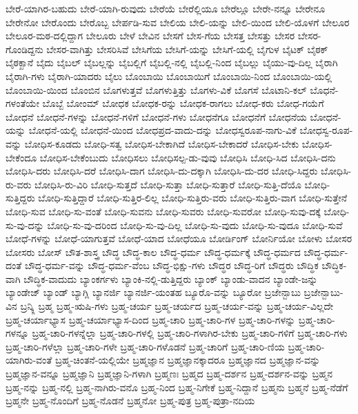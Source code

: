 {ಬೇರೆ-ಯಾಗಿರ-ಬಹುದು
ಬೇರೆ-ಯಾಗಿ-ರುವುದು
ಬೇರೆಯೆ
ಬೇರೆಲ್ಲಿಯೂ
ಬೇರೆಲ್ಲೂ
ಬೇರೇ-ನನ್ನೂ
ಬೇರೇನೂ
ಬೇರೇನೋ
ಬೇರೊಂದು
ಬೇರೊಬ್ಬ
ಬೇರ್ಪಡಿ-ಸುವ
ಬೇಲಿಯ
ಬೇಲಿ-ಯನ್ನು
ಬೇಲಿ-ಯಿಂದ
ಬೇಲಿ-ಯೊಳಗೆ
ಬೇಲೂರ
ಬೇಲೂರ-ಮಠ-ದಲ್ಲಿದ್ದಾಗ
ಬೇಲೂರು
ಬೇಳೆ
ಬೇವಿನ
ಬೇಸಗೆ
ಬೇಸ-ಗೆಯ
ಬೇಸತ್ತ
ಬೇಸತ್ತು
ಬೇಸರ
ಬೇಸರ-ಗೊಂಡಿದ್ದನು
ಬೇಸರ-ವಾಗಿತ್ತು
ಬೇಸರಿಸಿವೆ
ಬೇಸಿಗೆಯ
ಬೇಸಿಗೆ-ಯನ್ನು
ಬೇಸಿಗೆ-ಯಲ್ಲಿ
ಬೈಗುಳ
ಬೈಟಕ್
ಬೈಠಕ್
ಬೈಠಕ್ಖಾನೆ
ಬೈದು
ಬೈಬಲ್
ಬೈಬಲ್ಲನ್ನು
ಬೈಬಲ್ಲಿಗೆ
ಬೈಬಲ್ಲಿ-ನಲ್ಲಿ
ಬೈಬಲ್ಲಿ-ನಿಂದ
ಬೈಬಲ್ಲು
ಬೈಯು-ವು-ದಿಲ್ಲ
ಬೈರಾಗಿ
ಬೈರಾಗಿ-ಗಳು
ಬೈರಾಗಿ-ಯಾದರು
ಬೈಲು
ಬೊಂಬಾಯಿ
ಬೊಂಬಾಯಿಗೆ
ಬೊಂಬಾಯಿ-ನಿಂದ
ಬೊಂಬಾಯಿ-ಯಲ್ಲಿ
ಬೊಂಬಾಯಿ-ಯಿಂದ
ಬೊಂಬಿನ
ಬೊಗಳುತ್ತವೆ
ಬೊಗಳುತ್ತಿತ್ತು
ಬೊಗಳು-ವಿಕೆ
ಬೊಗಸೆ
ಬೊಟಾನಿ-ಕಲ್
ಬೊಧನೆ-ಗಳಂತೆಯೇ
ಬೊಬ್ಬೆ
ಬೋಂಮ್
ಬೋಧಕ
ಬೋಧಕ-ರನ್ನು
ಬೋಧಕ-ರಾಗಲು
ಬೋಧ-ಕರು
ಬೋಧ-ಗಯೆಗೆ
ಬೋಧನೆ
ಬೋಧನೆ-ಗಳನ್ನು
ಬೋಧನೆ-ಗಳಿಗೆ
ಬೋಧನೆ-ಗಳು
ಬೋಧನೆಗೂ
ಬೋಧನೆಗೆ
ಬೋಧನೆಯ
ಬೋಧನೆ-ಯನ್ನು
ಬೋಧನೆ-ಯಲ್ಲಿ
ಬೋಧನೆ-ಯಿಂದ
ಬೋಧಪ್ರದ-ವಾದು-ದನ್ನು
ಬೋಧಸ್ವರೂಪ-ನಾಗು-ವಿಕೆ
ಬೋಧಸ್ವ-ರೂಪ-ವನ್ನು
ಬೋಧಿಸ-ಕೂಡದು
ಬೋಧಿ-ಸತ್ವ
ಬೋಧಿಸ-ಬೇಕಾಗಿದೆ
ಬೋಧಿಸ-ಬೇಕಾದರೆ
ಬೋಧಿಸ-ಬೇಕು
ಬೋಧಿಸ-ಬೇಕೆಂದೂ
ಬೋಧಿಸ-ಬೇಕೆಂಬುದು
ಬೋಧಿಸಲು
ಬೋಧಿಸಲ್ಪ-ಡು-ವುವು
ಬೋಧಿಸಿ
ಬೋಧಿ-ಸಿದ
ಬೋಧಿಸಿ-ದನು
ಬೋಧಿಸಿ-ದರು
ಬೋಧಿಸಿ-ದರೆ
ಬೋಧಿಸಿ-ದಾಗ
ಬೋಧಿಸಿ-ದು-ದಕ್ಕಾಗಿ
ಬೋಧಿಸಿ-ದು-ದರ
ಬೋಧಿ-ಸಿದ್ದರು
ಬೋಧಿಸಿ-ರು-ವರು
ಬೋಧಿಸಿ-ರು-ವಿರಿ
ಬೋಧಿ-ಸುತ್ತದೆ
ಬೋಧಿ-ಸುತ್ತಾ
ಬೋಧಿ-ಸುತ್ತಾರೆ
ಬೋಧಿ-ಸುತ್ತಿ-ದೆಯೊ
ಬೋಧಿ-ಸುತ್ತಿದ್ದರು
ಬೋಧಿ-ಸುತ್ತಿದ್ದಾರೆ
ಬೋಧಿ-ಸುತ್ತಿರ-ಲಿಲ್ಲ
ಬೋಧಿ-ಸುತ್ತಿರು-ವರು
ಬೋಧಿ-ಸುತ್ತಿರು-ವಾಗ
ಬೋಧಿ-ಸುತ್ತೇನೆ
ಬೋಧಿ-ಸುವ
ಬೋಧಿ-ಸು-ವಂತೆ
ಬೋಧಿ-ಸುವನು
ಬೋಧಿ-ಸುವರು
ಬೋಧಿ-ಸುವರೋ
ಬೋಧಿ-ಸುವು-ದಕ್ಕೆ
ಬೋಧಿ-ಸು-ವು-ದನ್ನು
ಬೋಧಿ-ಸು-ವು-ದರಿಂದ
ಬೋಧಿ-ಸು-ವು-ದಿಲ್ಲ
ಬೋಧಿ-ಸು-ವುದು
ಬೋಧಿ-ಸು-ವುದೂ
ಬೋಧಿ-ಸುವೆ
ಬೋಧೆ-ಗಳನ್ನು
ಬೋಧೆ-ಯಾಗುತ್ತವೆ
ಬೋಧೆ-ಯಾದ
ಬೋಧೆಯೂ
ಬೋರ್ಡಿಂಗ್
ಬೋರ್ನಿಯೋ
ಬೋಳು
ಬೋಸರ
ಬೋಸರು
ಬೋಸ್
ಬೌತ-ಶಾಸ್ತ್ರ
ಬೌದ್ಧ
ಬೌದ್ಧ-ಕಾಲ
ಬೌದ್ಧ-ಧರ್ಮ
ಬೌದ್ಧ-ಧರ್ಮಕ್ಕೆ
ಬೌದ್ಧ-ಧರ್ಮದ
ಬೌದ್ಧ-ಧರ್ಮ-ದಂತೆ
ಬೌದ್ಧ-ಧರ್ಮ-ವನ್ನು
ಬೌದ್ಧ-ಧರ್ಮ-ವೆಂಬ
ಬೌದ್ಧ-ಭಿಕ್ಷು-ಗಳು
ಬೌದ್ಧರ
ಬೌದ್ಧ-ರಿಗೆ
ಬೌದ್ಧರು
ಬೌದ್ಧಿಕ
ಬೌದ್ಧಿಕ-ವಾಗಿ
ಬೌದ್ಧಿಕ-ವಾದುದು
ಬ್ಯಾಂಕರ್ಗಳು
ಬ್ಯಾಂಕಿ-ನಲ್ಲಿ-ಡುತ್ತಿದ್ದರು
ಬ್ಯಾಂಕ್
ಬ್ಯಾಂಡು-ವಾದನ
ಬ್ಯಾಂಡೇ-ಜನ್ನು
ಬ್ಯಾಂಡೇಜ್
ಬ್ಯಾಂಡ್
ಬ್ಯಾಗ್ಲಿ
ಬ್ಯಾನರ್ಜಿ
ಬ್ಯಾನರ್ಜಿ-ಯಂತಹ
ಬ್ಯೂರೊ-ವನ್ನು
ಬ್ಯೂರೋ
ಬ್ರಜೇನ್ಬಾಬು
ಬ್ರಜೇನ್ಬಾಬು-ವಿನ
ಬ್ರನ್ಕ್ಲಿ
ಬ್ರಹ್ಮ
ಬ್ರಹ್ಮ-ಋಷಿ-ಗಳು
ಬ್ರಹ್ಮ-ಚರ್ಯ
ಬ್ರಹ್ಮ-ಚರ್ಯದ
ಬ್ರಹ್ಮ-ಚರ್ಯ-ವನ್ನು
ಬ್ರಹ್ಮ-ಚರ್ಯ-ವಿಲ್ಲದೇ
ಬ್ರಹ್ಮ-ಚರ್ಯಾಭ್ಯಾಸ
ಬ್ರಹ್ಮ-ಚರ್ಯಾಭ್ಯಾಸ-ದಿಂದ
ಬ್ರಹ್ಮ-ಚಾರಿ
ಬ್ರಹ್ಮ-ಚಾರಿ-ಗಳ
ಬ್ರಹ್ಮ-ಚಾರಿ-ಗಳನ್ನು
ಬ್ರಹ್ಮ-ಚಾರಿ-ಗಳನ್ನೂ
ಬ್ರಹ್ಮ-ಚಾರಿ-ಗಳನ್ನೆಲ್ಲಾ
ಬ್ರಹ್ಮ-ಚಾರಿ-ಗಳಲ್ಲಿ
ಬ್ರಹ್ಮ-ಚಾರಿ-ಗಳಾಗಿರ-ಬೇಕು
ಬ್ರಹ್ಮ-ಚಾರಿ-ಗಳಿಗೆ
ಬ್ರಹ್ಮ-ಚಾರಿ-ಗಳು
ಬ್ರಹ್ಮ-ಚಾರಿ-ಗಳೆಲ್ಲಾ
ಬ್ರಹ್ಮ-ಚಾರಿ-ಗಳೇ
ಬ್ರಹ್ಮ-ಚಾರಿ-ಗಳೊಡನೆ
ಬ್ರಹ್ಮ-ಚಾರಿಗೆ
ಬ್ರಹ್ಮ-ಚಾರಿ-ಣಿಯ
ಬ್ರಹ್ಮ-ಚಾರಿ-ಯಾಗಿರು-ವಂತೆ
ಬ್ರಹ್ಮ-ಚಿಂತನೆ-ಯಲ್ಲಿಯೇ
ಬ್ರಹ್ಮಜ್ಞಾನ
ಬ್ರಹ್ಮಜ್ಞಾನಕ್ಕಾದರೂ
ಬ್ರಹ್ಮಜ್ಞಾನದ
ಬ್ರಹ್ಮಜ್ಞಾನ-ವನ್ನು
ಬ್ರಹ್ಮಜ್ಞಾನ-ವನ್ನೂ
ಬ್ರಹ್ಮಜ್ಞಾನಿ
ಬ್ರಹ್ಮಜ್ಞಾನಿ-ಗಳಾಗಿ
ಬ್ರಹ್ಮಣಃ
ಬ್ರಹ್ಮದ
ಬ್ರಹ್ಮ-ದರ್ಶನ
ಬ್ರಹ್ಮ-ದರ್ಶನ-ವನ್ನು
ಬ್ರಹ್ಮನ
ಬ್ರಹ್ಮ-ನನ್ನು
ಬ್ರಹ್ಮ-ನಲ್ಲಿ
ಬ್ರಹ್ಮ-ನಾಗಿರು-ವನೊ
ಬ್ರಹ್ಮ-ನಿಂದ
ಬ್ರಹ್ಮ-ನಿಗೇಕೆ
ಬ್ರಹ್ಮ-ನಿದ್ದಾನೆ
ಬ್ರಹ್ಮನು
ಬ್ರಹ್ಮನೆ
ಬ್ರಹ್ಮ-ನೆಡೆಗೆ
ಬ್ರಹ್ಮನೇ
ಬ್ರಹ್ಮ-ನೊಂದಿಗೆ
ಬ್ರಹ್ಮ-ನೊಡನೆ
ಬ್ರಹ್ಮನೋ
ಬ್ರಹ್ಮ-ಪುತ್ರ
ಬ್ರಹ್ಮ-ಪುತ್ರಾ-ನದಿಯ
}
